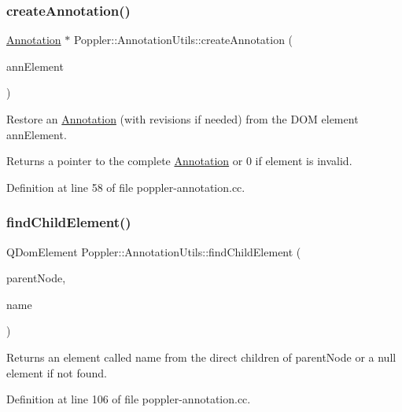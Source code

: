 \subsubsection{\texorpdfstring{create\+Annotation()}{createAnnotation()}}
{\footnotesize\ttfamily \hyperlink{class_poppler_1_1_annotation}{Annotation} $\ast$ Poppler\+::\+Annotation\+Utils\+::create\+Annotation (\begin{DoxyParamCaption}\item[{const Q\+Dom\+Element \&}]{ann\+Element }\end{DoxyParamCaption})\hspace{0.3cm}{\ttfamily [static]}}

Restore an \hyperlink{class_poppler_1_1_annotation}{Annotation} (with revisions if needed) from the D\+OM element {\ttfamily ann\+Element}. \begin{DoxyReturn}{Returns}
a pointer to the complete \hyperlink{class_poppler_1_1_annotation}{Annotation} or 0 if element is invalid. 
\end{DoxyReturn}


Definition at line 58 of file poppler-\/annotation.\+cc.

\mbox{\label{class_poppler_1_1_annotation_utils_add8a7dc39bd8225aa8d7ff7d53be70b8}} 
\subsubsection{\texorpdfstring{find\+Child\+Element()}{findChildElement()}}
{\footnotesize\ttfamily Q\+Dom\+Element Poppler\+::\+Annotation\+Utils\+::find\+Child\+Element (\begin{DoxyParamCaption}\item[{const Q\+Dom\+Node \&}]{parent\+Node,  }\item[{const Q\+String \&}]{name }\end{DoxyParamCaption})\hspace{0.3cm}{\ttfamily [static]}}

Returns an element called {\ttfamily name} from the direct children of {\ttfamily parent\+Node} or a null element if not found. 

Definition at line 106 of file poppler-\/annotation.\+cc.


